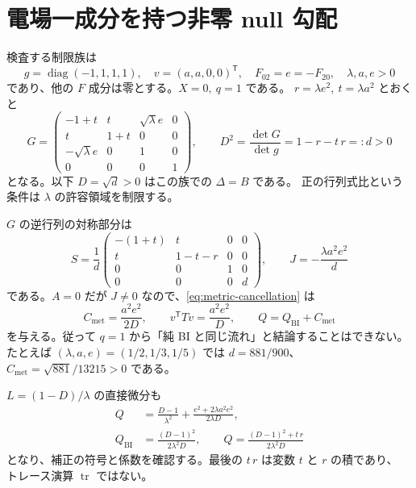 \documentclass[11pt,a4paper]{article}
\newcommand{\tr}{\operatorname{tr}}
\newcommand{\Qbi}{Q_{\mathrm{BI}}}
\newcommand{\Cmet}{C_{\mathrm{met}}}
\begin{document}
\newpage
\section{電場一成分を持つ非零 null 勾配}
検査する制限族は
\begin{equation}\label{eq:null-family}
g=\operatorname{diag}(-1,1,1,1),\quad
v=(a,a,0,0)^{\mathsf T},\quad F_{02}=e=-F_{20},\quad
\lambda,a,e>0
\end{equation}
であり、他の $F$ 成分は零とする。$X=0,\ q=1$ である。
$r=\lambda e^2,\ t=\lambda a^2$ とおくと
\begin{equation}\label{eq:null-matrix}
G=\begin{pmatrix}
-1+t&t&\sqrt\lambda e&0\\
t&1+t&0&0\\
-\sqrt\lambda e&0&1&0\\
0&0&0&1
\end{pmatrix},\qquad
D^2=\frac{\det G}{\det g}=1-r-t\,r=:d>0
\end{equation}
となる。以下 $D=\sqrt d>0$ はこの族での $\Delta=B$ である。
正の行列式比という条件は $\lambda$ の許容領域を制限する。

$G$ の逆行列の対称部分は
\begin{equation}\label{eq:null-S}
S=\frac1d\begin{pmatrix}
-(1+t)&t&0&0\\
t&1-t-r&0&0\\
0&0&1&0\\
0&0&0&d
\end{pmatrix},\qquad
J=-\frac{\lambda a^2e^2}{d}
\end{equation}
である。$A=0$ だが $J\ne0$ なので、\eqref{eq:metric-cancellation} は
\begin{equation}\label{eq:null-correction}
\boxed{\displaystyle
\Cmet=\frac{a^2e^2}{2D},\qquad
v^{\mathsf T}Tv=\frac{a^2e^2}{D},\qquad
Q=\Qbi+\Cmet }
\end{equation}
を与える。従って $q=1$ から「純 BI と同じ流れ」と結論することはできない。
たとえば $(\lambda,a,e)=(1/2,1/3,1/5)$ では
$d=881/900$、$\Cmet=\sqrt{881}/13215>0$ である。

$L=(1-D)/\lambda$ の直接微分も
\begin{equation}\label{eq:null-direct}
\begin{split}
Q&=\frac{D-1}{\lambda^2}
 +\frac{e^2+2\lambda a^2e^2}{2\lambda D},\\
\Qbi&=\frac{(D-1)^2}{2\lambda^2D},\qquad
Q=\frac{(D-1)^2+t\,r}{2\lambda^2D}
\end{split}
\end{equation}
となり、補正の符号と係数を確認する。最後の $t\,r$ は変数 $t$ と $r$ の積であり、
トレース演算 $\tr$ ではない。
\end{document}
